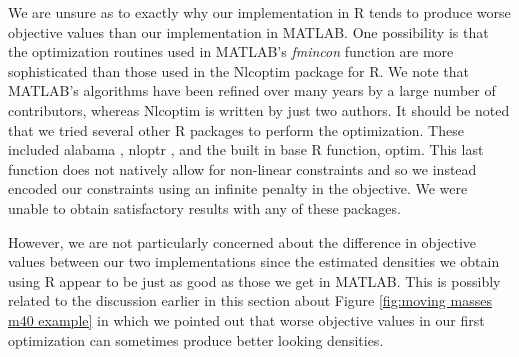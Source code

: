 We are unsure as to exactly why our implementation in R tends to produce worse objective values than our implementation in MATLAB. One possibility is that the optimization routines used in MATLAB's \emph{fmincon} function are more sophisticated than those used in the Nlcoptim package for R. We note that MATLAB's algorithms have been refined over many years by a large number of contributors, whereas Nlcoptim is written by just two authors. It should be noted that we tried several other R packages to perform the optimization. These included alabama \cite{Varadhan2015-ra}, nloptr \cite{Ypma2018-og}, and the built in base R function, optim. This last function does not natively allow for non-linear constraints and so we instead encoded our constraints using an infinite penalty in the objective. We were unable to obtain satisfactory results with any of these packages.

However, we are not particularly concerned about the difference in objective values between our two implementations since the estimated densities we obtain using R appear to be just as good as those we get in MATLAB. This is possibly related to the discussion earlier in this section about Figure \ref{fig:moving masses m40 example} in which we pointed out that worse objective values in our first optimization can sometimes produce better looking densities.










